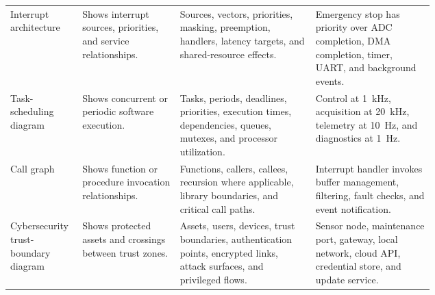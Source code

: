 \begin{singlespace}
\begin{longtable}{@{}L{0.17\linewidth} L{0.23\linewidth} L{0.32\linewidth} L{\tabcolsep\relax}@{}}
\addlinespace[3pt]
Interrupt architecture & Shows interrupt sources, priorities, and service relationships. & Sources, vectors, priorities, masking, preemption, handlers, latency targets, and shared-resource effects. & Emergency stop has priority over ADC completion, DMA completion, timer, UART, and background events. \\
\addlinespace[3pt]
Task-scheduling diagram & Shows concurrent or periodic software execution. & Tasks, periods, deadlines, priorities, execution times, dependencies, queues, mutexes, and processor utilization. & Control at 1~kHz, acquisition at 20~kHz, telemetry at 10~Hz, and diagnostics at 1~Hz. \\
\addlinespace[3pt]
Call graph & Shows function or procedure invocation relationships. & Functions, callers, callees, recursion where applicable, library boundaries, and critical call paths. & Interrupt handler invokes buffer management, filtering, fault checks, and event notification. \\
\addlinespace[3pt]
Cybersecurity trust-boundary diagram & Shows protected assets and crossings between trust zones. & Assets, users, devices, trust boundaries, authentication points, encrypted links, attack surfaces, and privileged flows. & Sensor node, maintenance port, gateway, local network, cloud API, credential store, and update service. \\
\end{longtable}
\end{singlespace}


